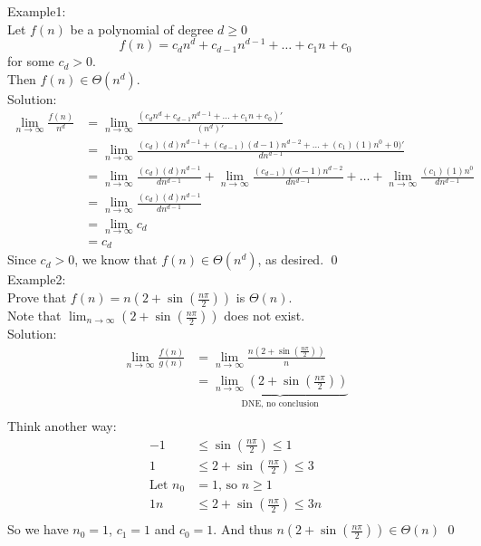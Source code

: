 \documentclass[letterpaper, 12pt]{article}
\begin{document}
    Example1:\\
    Let $f(n)$ be a polynomial of degree $d \geq 0$\\
    $$f(n) = c_dn^d + c_{d - 1}n^{d-1} + \dots + c_1n + c_0$$
    for some $c_d > 0$.\\
    Then $f(n) \in \Theta(n^d)$.\\
    \bigskip
    Solution:\\
    \begin{align*}
        \lim_{n \rightarrow \infty} \frac{f(n)}{n^d} &= \lim_{n \rightarrow \infty} \frac{(c_dn^d + c_{d - 1}n^{d-1} + \dots + c_1n + c_0)'}{(n^d)'}\\
        &= \lim_{n \rightarrow \infty} \frac{(c_d)(d)n^{d-1} + (c_{d - 1})(d-1)n^{d-2} + \dots + (c_1)(1)n^0 + 0)'}{dn^{d-1}}\\
        &= \lim_{n \rightarrow \infty} \frac{(c_d)(d)n^{d-1}}{dn^{d-1}} + \lim_{n \rightarrow \infty} \frac{(c_{d - 1})(d-1)n^{d-2}}{dn^{d-1}} + \dots + \lim_{n \rightarrow \infty}\frac{(c_1)(1)n^0}{dn^{d-1}}\\
        &= \lim_{n \rightarrow \infty} \frac{(c_d)(d)n^{d-1}}{dn^{d-1}}\\
        &= \lim_{n \rightarrow \infty} c_d\\
        &= c_d
    \end{align*}
    Since $c_d > 0$, we know that $f(n) \in \Theta(n^d)$, as desired. \qed\\
    
    \bigskip
    Example2:\\
    Prove that $f(n) = n(2 + \sin(\frac{n\pi}{2}))$ is $\Theta(n)$.\\
    Note that $\lim_{n \rightarrow \infty} (2 + \sin(\frac{n\pi}{2}))$ does not exist.\\
    \bigskip
    Solution:\\
    \begin{align*}
        \lim_{n \rightarrow \infty}\frac{f(n)}{g(n)} &= \lim_{n \rightarrow \infty}\frac{n(2 + \sin(\frac{n\pi}{2}))}{n}\\
        &= \underbrace{\lim_{n \rightarrow \infty}(2 + \sin(\frac{n\pi}{2}))}_{\text{DNE, no conclusion}}\\
    \end{align*}
    Think another way:
    \begin{align*}
        -1 &\leq \sin(\frac{n\pi}{2}) \leq 1\\
        1 &\leq 2 + \sin(\frac{n\pi}{2}) \leq 3\\
        \text{Let } n_0 &= 1 \text{, so } n \geq 1\\
        1n &\leq 2 + \sin(\frac{n\pi}{2}) \leq 3n\\
    \end{align*}
    So we have $n_0 = 1$, $c_1 = 1$ and $c_0 = 1$. And thus $n(2 + \sin(\frac{n\pi}{2})) \in \Theta(n)$ \qed \\
    \pagebreak
\end{document}
